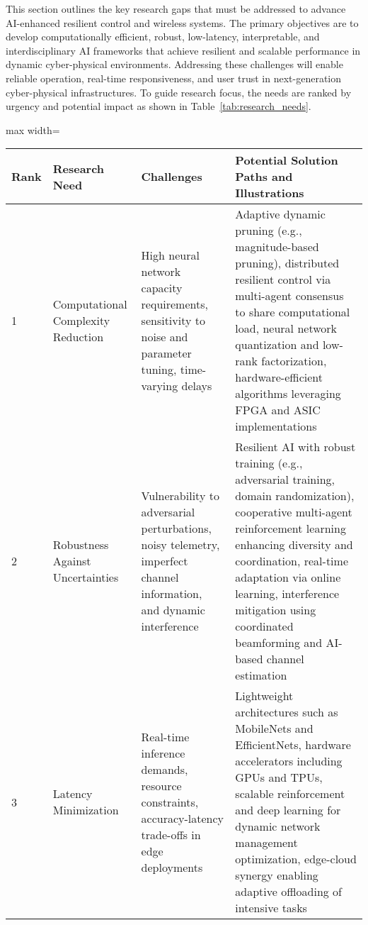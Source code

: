 \documentclass[sigconf]{acmart}
\begin{document}
This section outlines the key research gaps that must be addressed to advance AI-enhanced resilient control and wireless systems. The primary objectives are to develop computationally efficient, robust, low-latency, interpretable, and interdisciplinary AI frameworks that achieve resilient and scalable performance in dynamic cyber-physical environments. Addressing these challenges will enable reliable operation, real-time responsiveness, and user trust in next-generation cyber-physical infrastructures. To guide research focus, the needs are ranked by urgency and potential impact as shown in Table~\ref{tab:research_needs}.

\begin{table*}[htbp]
\centering
\caption{Summary of Key Research Challenges Ranked by Urgency and Potential Impact, with Specific Illustrative Techniques}
\label{tab:research_needs}
\begin{adjustbox}{max width=\textwidth}
\begin{tabular}{@{}llll@{}}
\toprule
\textbf{Rank} & \textbf{Research Need} & \textbf{Challenges} & \textbf{Potential Solution Paths and Illustrations} \\ \midrule
1 & Computational Complexity Reduction & High neural network capacity requirements, sensitivity to noise and parameter tuning, time-varying delays & Adaptive dynamic pruning (e.g., magnitude-based pruning), distributed resilient control via multi-agent consensus to share computational load, neural network quantization and low-rank factorization, hardware-efficient algorithms leveraging FPGA and ASIC implementations~\cite{ref46} \\
2 & Robustness Against Uncertainties & Vulnerability to adversarial perturbations, noisy telemetry, imperfect channel information, and dynamic interference & Resilient AI with robust training (e.g., adversarial training, domain randomization), cooperative multi-agent reinforcement learning enhancing diversity and coordination, real-time adaptation via online learning, interference mitigation using coordinated beamforming and AI-based channel estimation~\cite{ref48} \\
3 & Latency Minimization & Real-time inference demands, resource constraints, accuracy-latency trade-offs in edge deployments & Lightweight architectures such as MobileNets and EfficientNets, hardware accelerators including GPUs and TPUs, scalable reinforcement and deep learning for dynamic network management optimization, edge-cloud synergy enabling adaptive offloading of intensive tasks~\cite{ref50} \\

\end{tabular}
\end{adjustbox}
\end{table*}
\end{document}
